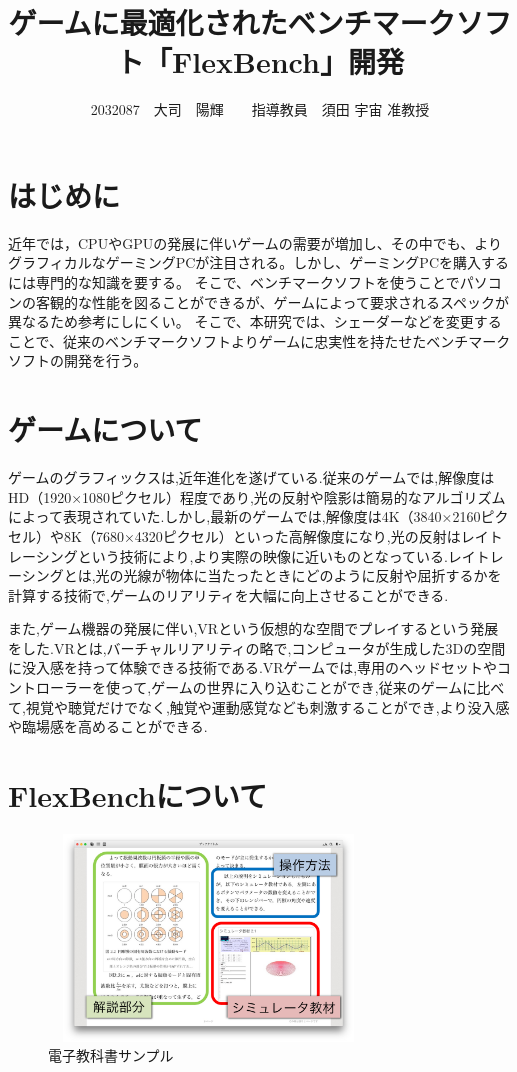 \documentclass[twocolumn,10pt,a4j]{ltjsarticle}
\title{ゲームに最適化されたベンチマークソフト「FlexBench」開発}
\author{2032087　大司　陽輝　　指導教員　須田 宇宙 准教授}
\date{}
\begin{document}
\maketitle

\section{はじめに}
近年では，CPUやGPUの発展に伴いゲームの需要が増加し、その中でも、よりグラフィカルなゲーミングPCが注目される。しかし、ゲーミングPCを購入するには専門的な知識を要する。
そこで、ベンチマークソフトを使うことでパソコンの客観的な性能を図ることができるが、ゲームによって要求されるスペックが異なるため参考にしにくい。
そこで、本研究では、シェーダーなどを変更することで、従来のベンチマークソフトよりゲームに忠実性を持たせたベンチマークソフトの開発を行う。

\section{ゲームについて}
ゲームのグラフィックスは,近年進化を遂げている.従来のゲームでは,解像度はHD（1920×1080ピクセル）程度であり,光の反射や陰影は簡易的なアルゴリズムによって表現されていた.しかし,最新のゲームでは,解像度は4K（3840×2160ピクセル）や8K（7680×4320ピクセル）といった高解像度になり,光の反射はレイトレーシングという技術により,より実際の映像に近いものとなっている.レイトレーシングとは,光の光線が物体に当たったときにどのように反射や屈折するかを計算する技術で,ゲームのリアリティを大幅に向上させることができる.

また,ゲーム機器の発展に伴い,VRという仮想的な空間でプレイするという発展をした.VRとは,バーチャルリアリティの略で,コンピュータが生成した3Dの空間に没入感を持って体験できる技術である.VRゲームでは,専用のヘッドセットやコントローラーを使って,ゲームの世界に入り込むことができ,従来のゲームに比べて,視覚や聴覚だけでなく,触覚や運動感覚なども刺激することができ,より没入感や臨場感を高めることができる.

\section{FlexBenchについて}





\begin{figure}[h]
\begin{center}
 \includegraphics[clip,width=85mm,height=55mm]{textbook.pdf}
\end{center}
 \caption{電子教科書サンプル}
 \label{fig:教科書}
\end{figure}
\end{document}
